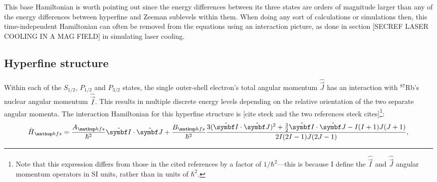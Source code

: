 This base Hamiltonian is worth pointing out since the energy differences between its three states are orders of magnitude larger than any of the energy differences between hyperfine and Zeeman sublevels within them. When doing any sort of calculations or simulations then, this time-independent Hamiltonian can often be removed from the equations using an interaction picture, as done in section [SECREF LASER COOLING IN A MAG FIELD] in simulating laser cooling. 

\subsection{Hyperfine structure}

Within each of the $S_{1/2}$, $P_{1/2}$ and $P_{3/2}$ states, the single outer-shell electron's total angular momentum $\hat {\vec J}$ has an interaction with $^{87}$Rb's nuclear angular momentum $\hat{\vec I}$. This results in multiple discrete energy levels depending on the relative orientation of the two separate angular momenta. The interaction Hamiltonian for this hyperfine structure is [cite steck and the two references steck cites]\footnote{Note that this expression differs from those in the cited references by a factor of $1/\hbar^2$---this is because I define the $\hat{\vec I}$ and $\hat{\vec J}$ angular momentum operators in SI units, rather than in units of $\hbar^2$.}:
\begin{align}\label{eq:H_hfs}
\hat H_\up{hfs} = \frac{A_\up{hfs}}{\hbar^2} \hat{\vec I} \cdot \hat {\vec J}
+ \frac{B_\up{hfs}}{\hbar^2}\frac
{3(\hat{\vec I}\cdot\hat{\vec J})^2 + \frac32 \hat{\vec I}\cdot\hat{\vec J} - I(I + 1)J(J + 1)}
{2I(2I - 1)J(2J - 1)},
\end{align}
